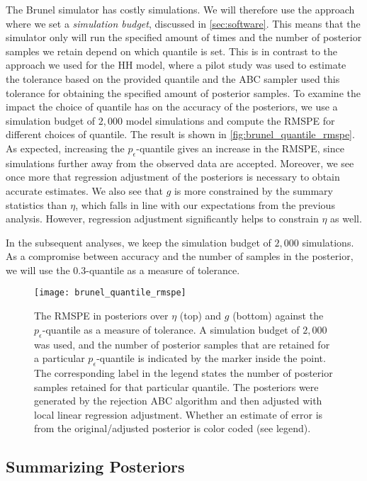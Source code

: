 The Brunel simulator has costly simulations. We will therefore use the approach where we set a \textit{simulation budget}, discussed in \cref{sec:software}. This means that the simulator only will run the specified amount of times and the number of posterior samples we retain depend on which quantile is set. This is in contrast to the approach we used for the HH model, where a pilot study was used to estimate the tolerance based on the provided quantile and the ABC sampler used this tolerance for obtaining the specified amount of posterior samples. To examine the impact the choice of quantile has on the accuracy of the posteriors, we use a simulation budget of $2,000$ model simulations and compute the RMSPE for different choices of quantile. The result is shown in \autoref{fig:brunel_quantile_rmspe}. As expected, increasing the $p_\epsilon$-quantile gives an increase in the RMSPE, since simulations further away from the observed data are accepted. Moreover, we see once more that regression adjustment of the posteriors is necessary to obtain accurate estimates. We also see that $g$ is more constrained by the summary statistics than $\eta$, which falls in line with our expectations from the previous analysis. However, regression adjustment significantly helps to constrain $\eta$ as well.  

In the subsequent analyses, we keep the simulation budget of $2,000$ simulations. As a compromise between accuracy and the number of samples in the posterior, we will use the $0.3$-quantile as a measure of tolerance.

\begin{figure}[H]
    \centering
    \texttt{[image: brunel\_quantile\_rmspe]}
    \caption{The RMSPE in posteriors over $\eta$ (top) and $g$ (bottom) against the $p_\epsilon$-quantile as a measure of tolerance. A simulation budget of $2,000$ was used, and the number of posterior samples that are retained for a particular $p_\epsilon$-quantile is indicated by the marker inside the point. The corresponding label in the legend states the number of posterior samples retained for that particular quantile. The posteriors were generated by the rejection ABC algorithm and then adjusted with local linear regression adjustment. Whether an estimate of error is from the original/adjusted posterior is color coded (see legend).
    }
    \label{fig:brunel_quantile_rmspe}
\end{figure}


\subsection{Summarizing Posteriors}


